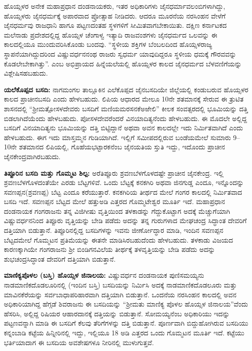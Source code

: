 ಹೊಯ್ಸಳರ ಅನೇಕ ಮಹಾಪ್ರಧಾನ ದಂಡನಾಯಕರು, ಇತರ ಅಧಿಕಾರಿಗಳು ಜೈನಧರ್ಮಾವಲಂಬಿಗಳಾಗಿದ್ದು, ಹೊಯ್ಸಳರು ಜೈನಧರ್ಮಕ್ಕೆ ಅಪಾರವಾದ ಪ್ರೋತ್ಸಾಹ ನೀಡಿದರು. ಆದರೂ ಮೂರನೆಯ ನರಸಿಂಹನ ವೇಳೆಗೆ ಜೈನಧರ್ಮವು ರಾಜಧಾನಿ ಹಾಗೂ ಪಟ್ಟಣದಂತಹ ಸ್ಥಳಗಳಿಗೆ ಸೀಮಿತವಾಗಬೇಕಾಯಿತು. ದಕ್ಷಿಣ ಕರ್ನಾಟಕದ ಮಲೆನಾಡು ಪ್ರದೇಶದಲ್ಲಿದ್ದ ಹೊಯ್ಸಳ ಚೆಂಗಾಳ್ವ ಇತ್ಯಾದಿ ರಾಜವಂಶಗಳು ಜೈನಧರ್ಮದ ಒಲವನ್ನು ಈ ಕಾಲದಲ್ಲಿಯೂ ಮುಂದುವರಿಸಿಕೊಂಡು ಬಂದವು. “ಸ್ಥಳೀಯ ಶಕ್ತಿಗಳ ಬೆಂಬಲದಿಂದ ಹೊಯ್ಸಳರಾಜ್ಯ ಸ್ಥಾಪನೆಯಾಗಿದ್ದುದರಿಂದ ವಿಷ್ಣುವರ್ಧನನಂಥ ರಾಜರು ಸ್ವಧರ್ಮ ಯಾವುದಿದ್ದರೂ ಸ್ಥಳೀಯ ಧಮಕ್ಕೆ ಗೌರವವನ್ನು ಕೊಡಲೇಬೇಕಾಗಿತ್ತು”. ಎಂಬ ಅಭಿಪ್ರಾಯದ ಹಿನ್ನೆಯಲೆಯಲ್ಲಿ ಹೊಯ್ಸಳರ ಕಾಲದ ಜೈನಧರ್ಮದ ಬೆಳವಣಿಗೆಯನ್ನು ವಿಶ್ಲೇಷಿಸಹಬಹುದು.

\textbf{ಯಲೆಕೊಪ್ಪದ ಬಸದಿ: } ನಾಗಮಂಗಲ ತಾಲ್ಲೂಕಿನ ಎಲೆಕೊಪ್ಪದ ಜೈನಬಸದಿಯೇ ಜಿಲ್ಲೆಯಲ್ಲಿ ಕಂಡುಬರುವ ಹೊಯ್ಸಳರ ಕಾಲದ ಪ್ರಾಚೀನಬಸದಿ ಎಂದು ಹೇಳಬಹುದು. ಲಿಪಿಯ ಆಧಾರದ ಮೇಲೂ 10ನೇ ಶತಮಾನಕ್ಕೆ ಸೇರುವ ಈ ತ್ರುಟಿತ ಶಾಸನದಲ್ಲಿ “ಶ‍್ರೀಮತ್ಪೋಸಳದೇವರು ಬಸದಿಗೆ ಮಣಿಯಮರಸನಕೆಅಱೇಲಿ” ಕೀಲಕ ಸಂವತ್ಸರದಲ್ಲಿ ಭೂಮಿಯನ್ನು ದತ್ತಿ ಬಿಡಲಾಗಿದೆಯೆಂದು ಹೇಳಬಹುದು. ಪೋಸಳದೇವರೆಂದರೆ ವಿನಯಾದಿತ್ಯನೆಂದು ಹೇಳಬಹುದು. ಈ ಮೊದಲೇ ಅಲ್ಲಿದ್ದ ಬಸದಿಗೆ ವಿನಯಾದಿತ್ಯನು ಭೂಮಿಯನ್ನು ದತ್ತಿ ಬಿಟ್ಟಿದ್ದಾನೆ ಅಥವಾ ಅವನ ಕಾಲದಲ್ಲೇ ಇದು ನಿರ್ಮಿತವಾಗಿದೆ ಎಂದು ಹೇಳಬಹುದು. ಈಗ ಇದು ಮಾಸ್ತಮ್ಮನ ಗುಡಿಯಾಗಿದೆ. ಇಲ್ಲಿಗೆ ಸಮೀಪದಲ್ಲಿರುವ ಬಂಡೆಯಮೇಲೆ ಸುಮಾರು 9–10ನೇ ಶತಮಾನದ ಲಿಪಿಯಲ್ಲಿ, ಗೊಹೆಯಭಟ್ಟಾರಕನೆಂಬ ಜೈನಯತಿಯ ಸ್ತುತಿ ಇದ್ದು, ಇದೊಂದು ಪ್ರಾಚೀನ ಜೈನಕೇಂದ್ರವಾಗಿರಬಹುದು.

\textbf{ ತಿಪ್ಪೂರಿನ ಬಸದಿ ಮತ್ತು ಗೊಮ್ಮಟ ಶಿಲ್ಪ:} ಅರೆತಿಪ್ಪೂರು ಶ್ರವಣಬೆಳಗೊಳದಷ್ಟೇ ಪ್ರಾಚೀನ ಜೈನಕೇಂದ್ರ. ಇಲ್ಲಿ ಶ್ರವಣಬೆಳಗೊಳದಂತೆಯೇ ಎರಡು ಬೆಟ್ಟಗಳಿವೆ. ಒಂದು ಬೆಟ್ಟಕ್ಕೆ ಕನಕಗಿರಿ ಅಥವಾ ಜಿನಗುಡ್ಡ ಎಂದೂ, ಇನ್ನೊಂದನ್ನು ಸವಣಪ್ಪನ(ಶ್ರವಣಪ್ಪ) ಬೆಟ್ಟ ಎಂದೂ ಕರೆಯುತ್ತಾರೆ. ಕನಕಗಿರಿಯ ತೀರ್ಥದ ಮೇಲೆ ಗಂಗರ ಕಾಲದಲ್ಲಿ ನಿರ್ಮಿತವಾದ ಬಸದಿ ಇದೆ. ಸವಣಪ್ಪನ ಬೆಟ್ಟದ ಮೇಲೆ ಹತ್ತುಅಡಿ ಎತ್ತರದ ಗೊಮ್ಮಟೇಶ್ವರ ಮೂರ್ತಿ ಇದೆ. ಮಹಾಪ್ರಧಾನ ದಂಡನಾಯಕ ಗಂಗರಾಜನು ತನ್ನ ವಿಜಿಗೀಷು ವೃತ್ತಿಯಿಂದ ತಳಕಾಡನ್ನು ಗೆದ್ದುಕೊಟ್ಟಾಗ ಅದಕ್ಕೆ ಮೆಚ್ಚುಗೆಯಾಗಿ ವಿಷ್ಣುವರ್ಧನನಿಂದ ತಿಪ್ಪೂರು ವೃತ್ತಿಯನ್ನು ಬೇಡಿ ಪಡೆದು ಅದನ್ನು ತನ್ನ ಗುರುಗಳಾದ ಮೇಘಚಂದ್ರ ಸಿದ್ಧಾಂತ ದೇವರಿಗೆ ದತ್ತಿಯಾಗಿ ಬಿಡುತ್ತಾನೆ. ತಿಪ್ಪೂರಿನಲ್ಲಿದ್ದ ಬಸದಿಗಳನ್ನು ಇವನು ಜೀರ್ಣೋದ್ಧಾರ ಮಾಡಿ, ಇಂದಿನ ಸವಣಪ್ಪನ ಬೆಟ್ಟದಮೇಲೆ ಗೊಮ್ಮಟನ ಪ್ರತಿಮೆಯನ್ನು ಈತನೇ ಮಾಡಿಸಿರಬಹುದೆಂದು ಹೇಳಬಹುದು. ತಳಕಾಡು ವಿಜಯದ ಕಾರಣಕ್ಕಾಗಿಯೇ ಗಂಗರಾಜನು ಶ‍್ರೀ ಬಿಂಡಿಗನವಿಲೆಯ ತೀರ್ಥಕ್ಕೆ ತಳವೃತ್ತಿಯನ್ನು ಬೇಡಿ ಪಡೆದು ಅದನ್ನು ಶುಭಚಂದ್ರಸಿದ್ಧಾಂತ ದೇವರಿಗೆ ದತ್ತಿಯಾಗಿ ಬಿಡುತ್ತಾನೆ.

\textbf{ಮಾಣಿಕ್ಯಪೊಳಲ (ಬಸ್ತಿ) ಹೊಯ್ಸಳ ಜಿನಾಲಯ:} ವಿಷ್ಣುವರ್ಧನ ದಂಡನಾಯಕ ಪುಣಿಸಮಯ್ಯನು ನಾಡಮಾಣಿಕದೊಡಲೂರಿನಲ್ಲಿ (ಇಂದಿನ ಬಸ್ತಿ) ಬಸದಿಯನ್ನು ನಿರ್ಮಿಸಿ ಅದಕ್ಕೆ ನಾಡಮಾಣಿಕದೊಡಲೂರು ಮತ್ತು ಮಾವಿನಕೆರೆಯನ್ನು ಸರ್ವಬಾಧಾಪರಿಹಾರವಾಗಿ ದತ್ತಿಯಾಗಿ ಬಿಡುತ್ತಾನೆ. ಒಂದನೆಯ ನರಸಿಂಹನ ಕಾಲದಲ್ಲಿ ಅವನ ಅಧಿಕಾರಿಯಾಗಿದ್ದ ಹೆಗ್ಗಡೆ ಶಿವರಾಜನು ಈ ಬಸದಿಯನ್ನು “ಶ‍್ರೀಮತು ಮಾಣಿಕ್ಯ ಪೊಳಲ ಹೊಯ್ಸಳ ಜಿನಾಲಯ”ವೆಂದು ಹೆಸರಿಸಿ, ಅಲ್ಲಿದ್ದ ರಿಷಿಯರ ಆಹಾರದಾನಕ್ಕೆ ದತ್ತಿಯನ್ನು ಬಿಡುತ್ತಾನೆ. ಸೋಮಯ್ಯನೆಂಬ ಅಧಿಕಾರಿಯು ಇದನ್ನು ಪಟ್ಟಣವನ್ನಾಗಿ ಮಾಡಿ ಈ ಬಸದಿಗೆ ಕೆಲವು ತೆರಿಗೆಗಳನ್ನು ದತ್ತಿ ಬಿಡುತ್ತಾನೆ. ಪೂರ್ಣವಾಗಿ ಬಿದ್ದುಹೋಗಿರುವ ಬಸದಿಯು ಕನ್ನಂಬಾಡಿ ಕಟ್ಟೆಯ ಹಿನ್ನೀರಿನಲ್ಲಿ ಇದ್ದು, ಇಲ್ಲಿಯೂ 18 ಅಡಿ ಎತ್ತರದ ಒಂದು ಗೊಮ್ಮಟನ ಮೂರ್ತಿ ಇದೆ. ಕಟ್ಟೆಯು ಭರ್ತಿಯಾದಾಗ ಈ ಬಸದಿಯ ಅವಶೇಷಗಳೂ ನೀರಿನಲ್ಲಿ ಮುಳುಗುತ್ತವೆ. 

